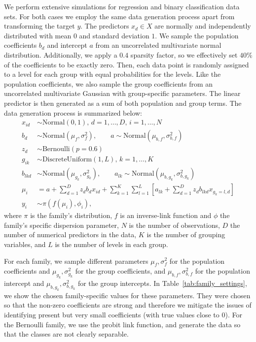 \documentclass{article}
\begin{document}
%
We perform extensive simulations for regression and binary classification data sets.
%
For both cases we employ the same data generation process apart from transforming the target $y$.
The predictors $x_d \in {X}$ are normally and independently distributed with mean $0$ and standard deviation $1$.
%
We sample the population coefficients $b_d$ and intercept $a$ from an uncorrelated multivariate normal distribution.
%
Additionally, we apply a $0.4$ sparsity factor, so we effectively set $40$\% of the coefficients to be exactly zero. 
Then, each data point is randomly assigned to a level for each group with equal probabilities for the levels.
Like the population coefficients, we also sample the group coefficients from an uncorrelated multivariate Gaussian with group-specific parameters.
%
The linear predictor is then generated as a sum of both population and group terms. %
The data generation process is summarized below:
\begin{align*}
    x_{id} & \sim \text{Normal}(0, 1) , \, d = 1,\ldots,D, \, i = 1,\ldots,N \\
    b_d & \sim \text{Normal}(\mu_f, \sigma^2_f),\qquad a \sim \text{Normal}(\mu_{b,f}, \sigma^2_{b,f}) \\
    z_d & \sim \text{Bernoulli}(p=0.6) \\
    g_{ik} & \sim \text{DiscreteUniform}(1, L) , \, k = 1,\ldots,K \\ %
    b_{lkd} & \sim \text{Normal}(\mu_{g_{k}}, \sigma^2_{g_{k}}),\qquad a_{lk}  \sim \text{Normal}(\mu_{b,g_{k}}, \sigma^2_{b,g_{k}}) \\
    \mu_i & = a + \sum_{d=1}^D z_db_dx_{id} + \sum_{k=1}^K\sum_{l=1}^L\left[a_{lk} + \sum_{d=1}^D z_db_{lkd}x_{g_k = l,d} \right] \\
    y_i & \sim \pi(f(\mu_i), \phi_i), 
\end{align*}
where $\pi$ is the family's distribution, $f$ is an inverse-link function and $\phi$ the family's specific dispersion parameter, $N$ is the number of observations, $D$ the number of numerical predictors in
the data, $K$ is the number of grouping variables, and $L$ is the number of levels in each group.
%

For each family, we sample different parameters $\mu_f, \sigma^2_f$ for the population coefficients and $\mu_{g_{k}}, \sigma^2_{g_{k}}$ for the group coefficients, and $\mu_{b,f}, \sigma^2_{b,f}$ for the population intercept and $\mu_{b,g_{k}}, \sigma^2_{b,g_{k}}$ for the group intercepts.
In Table~\ref{tab:family_settings}, we show the chosen family-specific values for these parameters.
They were chosen so that the non-zero coefficients are strong and therefore we mitigate the issues of identifying present but very small coefficients (with true values close to $0$).
For the Bernoulli family, we use the probit link function, and generate the data so that the classes are not clearly separable.
\end{document}
